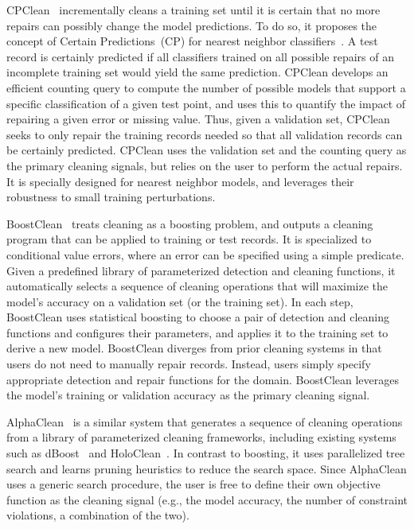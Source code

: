 \documentclass[11pt,dvipsnames]{article}
\begin{document}
CPClean~\cite{CPClean} incrementally cleans a training set until it is certain that no more repairs can possibly change the model predictions.  To do so, it proposes the concept of Certain Predictions~(CP) for nearest neighbor classifiers~\cite{CPClean}.  A test record is certainly predicted if all classifiers trained on all possible repairs of an incomplete training set would yield the same prediction.  CPClean develops an efficient counting query to compute the number of possible models that support a specific classification of a given test point, and uses this to quantify the impact of repairing a given error or missing value.  Thus, given a validation set, CPClean seeks to only repair the training records needed so that all validation records can be certainly predicted. 
CPClean uses the validation set and the counting query as the primary cleaning signals, but relies on the user to perform the actual repairs.   It is specially designed for nearest neighbor models, and leverages their robustness to small training perturbations.

\newpage
{}
BoostClean~\cite{BoostClean} treats cleaning as a boosting problem, and outputs a cleaning program that can be applied to training or test records.    It is specialized to conditional value errors, where an error can be specified using a simple predicate.    Given a predefined library of parameterized detection and cleaning functions, it automatically selects a sequence of cleaning operations that will maximize the model's accuracy on a validation set (or the training set).  In each step, BoostClean uses statistical boosting to choose a pair of detection and cleaning functions and configures their parameters, and applies it to the training set to derive a new model.   BoostClean diverges from prior cleaning systems in that users do not need to manually repair records.  Instead, users simply specify appropriate detection and repair functions for the domain.  BoostClean leverages the model's training or validation accuracy as the primary cleaning signal.

AlphaClean~\cite{AlphaClean} is a similar system that generates a sequence of cleaning operations from a library of parameterized cleaning frameworks, including existing systems such as dBoost~\cite{dBoost} and HoloClean~\cite{HoloClean}.  In contrast to boosting, it uses parallelized tree search and learns pruning heuristics to reduce the search space.  Since AlphaClean uses a generic search procedure, the user is free to define their own objective function as the cleaning signal (e.g., the model accuracy, the number of constraint violations, a combination of the two).
\end{document}
